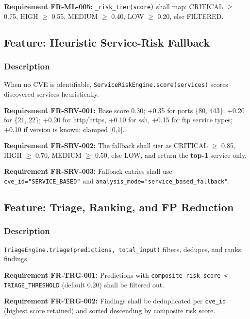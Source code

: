 \documentclass[10pt,journal,onecolumn]{IEEEtran}
\newcommand{\reqid}[1]{\textbf{#1}}
\begin{document}
\reqid{Requirement FR-ML-005:} \texttt{\_risk\_tier(score)} shall map: CRITICAL $\geq$ 0.75, HIGH $\geq$ 0.55, MEDIUM $\geq$ 0.40, LOW $\geq$ 0.20, else FILTERED.

\subsection{Feature: Heuristic Service-Risk Fallback}

\subsubsection{Description}

When no CVE is identifiable, \texttt{ServiceRiskEngine.\allowbreak score(services)} scores discovered services heuristically.

\reqid{Requirement FR-SRV-001:} Base score 0.30; +0.35 for ports \{80, 443\}; +0.20 for \{21, 22\}; +0.20 for http/https, +0.10 for ssh, +0.15 for ftp service types; +0.10 if version is known; clamped [0,1].

\reqid{Requirement FR-SRV-002:} The fallback shall tier as CRITICAL $\geq$ 0.85, HIGH $\geq$ 0.70, MEDIUM $\geq$ 0.50, else LOW, and return the \textbf{top-1} service only.

\reqid{Requirement FR-SRV-003:} Fallback entries shall use \texttt{cve\_id="SERVICE\_BASED"} and \texttt{analysis\_\allowbreak mode="service\_\allowbreak based\_\allowbreak fallback"}.

\subsection{Feature: Triage, Ranking, and FP Reduction}

\subsubsection{Description}

\texttt{TriageEngine.\allowbreak triage(predictions, total\_\allowbreak input)} filters, dedupes, and ranks findings.

\reqid{Requirement FR-TRG-001:} Predictions with \texttt{composite\_\allowbreak risk\_\allowbreak score < TRIAGE\_\allowbreak THRESHOLD} (default 0.20) shall be filtered out.

\reqid{Requirement FR-TRG-002:} Findings shall be deduplicated per \texttt{cve\_id} (highest score retained) and sorted descending by composite risk score.
\end{document}
